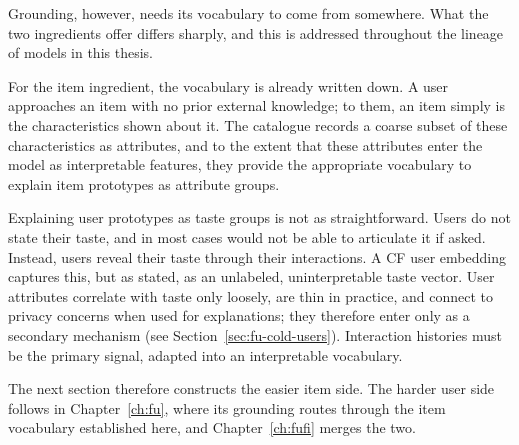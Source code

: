Grounding, however, needs its vocabulary to come from somewhere. What the two
ingredients offer differs sharply, and this is addressed throughout the
lineage of models in this thesis.

For the item ingredient, the vocabulary is already written down. A user
approaches an item with no prior external knowledge; to them, an item simply
is the characteristics shown about it. The catalogue records a coarse subset
of these characteristics as attributes, and to the extent that these
attributes enter the model as interpretable features, they provide the
appropriate vocabulary to explain item prototypes as attribute groups.

Explaining user prototypes as taste groups is not as straightforward. Users do
not state their taste, and in most cases would not be able to articulate it if
asked. Instead, users reveal their taste through their interactions. A CF user
embedding captures this, but as stated, as an unlabeled, uninterpretable taste
vector. User attributes correlate with taste only loosely, are thin in
practice, and connect to privacy concerns when used for explanations; they
therefore enter only as a secondary mechanism (see
Section~\ref{sec:fu-cold-users}). Interaction histories must be the primary
signal, adapted into an interpretable vocabulary.

The next section therefore constructs the easier item side. The harder user
side follows in Chapter~\ref{ch:fu}, where its grounding routes through the
item vocabulary established here, and Chapter~\ref{ch:fufi} merges the two.